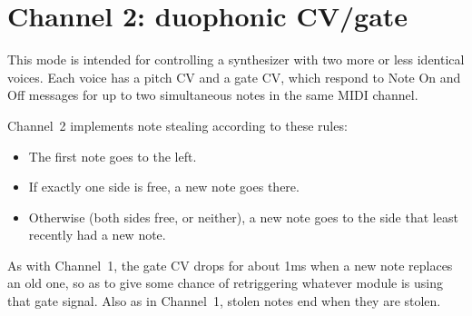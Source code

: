 
\section{Channel 2:  duophonic CV/gate}

This mode is intended for controlling a synthesizer with two more or less
identical voices.  Each voice has a pitch CV and a gate CV, which respond to
Note On and Off messages for up to two simultaneous notes in the same MIDI
channel.

{\centering
{}\par}

Channel~2 implements note stealing according to these rules:
\begin{itemize}
\item The first note goes to the left.
\item If exactly one side is free, a new note goes there.
\item Otherwise (both sides free, or neither), a new note goes to the side
that least recently had a new note.
\end{itemize}

As with Channel~1, the gate CV drops for about 1ms when a new note replaces
an old one, so as to give some chance of retriggering whatever module is
using that gate signal.  Also as in Channel~1, stolen notes end when they
are stolen.

